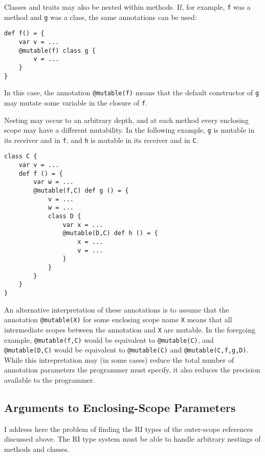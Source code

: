 \documentclass[letterpaper,11pt]{article}
\newcommand{\code}[1]{\lstinline$#1$}
\theoremstyle{definition}
\theoremstyle{remark}
\begin{document}

Classes and traits may also be nested within methods.
If, for example, \code{f} was a method and \code{g} was a class,
the same annotations can be used:
\begin{lstlisting}
def f() = {
	var v = ...
	@mutable(f) class g {
		v = ...
	}
}
\end{lstlisting}
In this case, the annotation \code{@mutable(f)}
means that the default constructor of \code{g} may mutate some variable
in the closure of \code{f}.

Nesting may occur to an arbitrary depth, and at each method every
enclosing scope may have a different mutability.
In the following example, \code{g} is mutable in its receiver and
in \code{f}, and \code{h} is mutable in its receiver and
in \code{C}.

\begin{lstlisting}
class C {
	var v = ...
	def f () = {
		var w = ...
		@mutable(f,C) def g () = {
			v = ...
			w = ...
			class D {
				var x = ...
				@mutable(D,C) def h () = {
					x = ...
					v = ...
				}
			}
		}
	}
}
\end{lstlisting}


An alternative interpretation of these annotations is to assume that
the annotation \code{@mutable(X)} for some enclosing scope name \code{X}
means that all intermediate scopes between the annotation and \code{X}
are mutable.
In the foregoing example, \code{@mutable(f,C)} would be equivalent
to \code{@mutable(C)}, and \code{@mutable(D,C)} would be equivalent
to \code{@mutable(C)} and \code{@mutable(C,f,g,D)}.
While this intrepretation may (in some cases) reduce the total number
of annotation parameters the programmer must specify, it also reduces
the precision available to the programmer.

\subsection{Arguments to Enclosing-Scope Parameters}

I address here the problem of finding the RI types of the
outer-scope references discussed above.
The RI type system must be able to handle 
arbitrary nestings of methods and classes.
\end{document}
